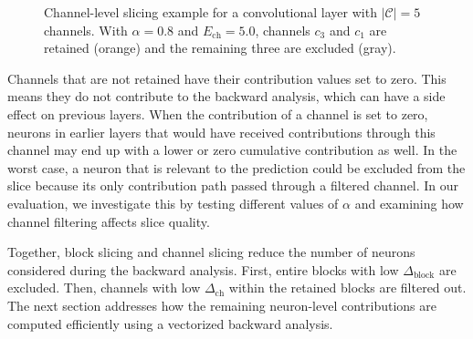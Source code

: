 \documentclass[
12pt,
fancyheadings,
a4paper,
twoside,
BCOR=0.7cm,
nobcorignoretitle,
grayscalebody,
]{stsreprt}
\begin{document}
\vspace{0.5cm}
\begin{figure}[ht!]
    \centering
    \caption{Channel-level slicing example for a convolutional layer with $|\mathcal{C}| = 5$ channels. With $\alpha = 0.8$ and $E_{\text{ch}} = 5.0$, channels $c_3$ and $c_1$ are retained (orange) and the remaining three are excluded (gray).}
    \label{fig:channel_slicing}
\end{figure}

Channels that are not retained have their contribution values set to zero.
This means they do not contribute to the backward analysis, which can have a side effect on
previous layers.
When the contribution of a channel is set to zero, neurons in earlier layers that would have
received contributions through this channel may end up with a lower or zero cumulative contribution
as well.
In the worst case, a neuron that is relevant to the prediction could be excluded from the slice
because its only contribution path passed through a filtered channel.
In our evaluation, we investigate this by testing different values of $\alpha$ and examining how
channel filtering affects slice quality.

Together, block slicing and channel slicing reduce the number of neurons considered during the
backward analysis.
First, entire blocks with low $\Delta_{\text{block}}$ are excluded.
Then, channels with low $\Delta_{\text{ch}}$ within the retained blocks are filtered out.
The next section addresses how the remaining neuron-level contributions are computed efficiently
using a vectorized backward analysis.
\end{document}
